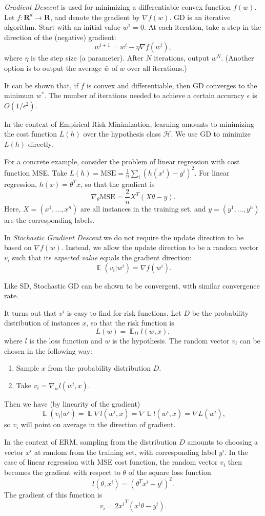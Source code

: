 \documentclass{article}
\newcommand{\R}{\mathbf{R}}
\newcommand{\grad}{\nabla}
\newcommand{\MSE}{\textrm{MSE}}
\DeclareMathOperator{\E}{\mathbb{E}}
\begin{document}
\emph{Gradient Descent} is used for minimizing a differentiable convex function
$f(w)$. Let $f:\R^d\to\R$, and denote the gradient by $\grad f(w)$.
GD is an iterative algorithm. Start with an initial value $w^1=0$. At each
iteration, take a step in the direction of the (negative) gradient:
\[ w^{i+1} = w^i-\eta\grad f(w^i), \]
where $\eta$ is the step size (a parameter). After $N$ iterations, output
$w^N$. (Another option is to output the average $\bar w$ of $w$ over all
iterations.)

It can be shown that, if $f$ is convex and differentiable, then GD converges to
the minimum $w^*$. The number of iterations needed to achieve a certain
accuracy $\epsilon$ is $O(1/\epsilon^2)$.

In the context of Empirical Risk Minimization, learning amounts to minimizing
the cost function $L(h)$ over the hypothesis class $\mathcal{H}$. We use GD to
minimize $L(h)$ directly.

For a concrete example, consider the problem of linear regression with cost
function MSE. Take $L(h) = \MSE = \frac{1}{n}\sum_i (h(x^i)-y^i)^2$. For linear
regression, $h(x)=\theta^T x$, so that the gradient is 
\[ \grad_\theta \MSE = \frac{2}{n} X^T(X\theta-y). \]
Here, $X=(x^1,\dotsc,x^n)$ are all instances in the training set, and
$y=(y^1,\dotsc,y^n)$ are the corresponding labels.

In \emph{Stochastic Gradient Descent} we do not require the update direction to
be based on $\grad f(w)$. Instead, we allow the update direction to be a random
vector $v_i$ such that its \emph{expected value} equals the gradient direction:
\[ \E{(v_i|w^i)}=\grad f(w^i).\]

Like SD, Stochastic GD can be shown to be convergent, with similar convergence
rate.

It turns out that $v^i$ is easy to find for risk functions. Let $D$ be the
probability distribution of instances $x$, so that the risk function is
\[ L(w)=\E_D{l(w,x)}, \]
where $l$ is the loss function and $w$ is the hypothesis. 
The random vector $v_i$ can be chosen in the following way:
\begin{enumerate}
    \item Sample $x$ from the probability distribution $D$.
    \item Take $v_i=\grad_w l(w^i, x)$.
\end{enumerate}
Then we have (by linearity of the gradient)
\[ \E{(v_i|w^i)} = \E{\grad l(w^i, x)} = \grad\E{l(w^i,x)} = \grad L(w^i), \]
so $v_i$ will point on average in the direction of gradient.


In the context of ERM, sampling from the distribution $D$ amounts to choosing a
vector $x^i$ at random from the training set, with corresponding label $y^i$.
In the case of linear regression with MSE cost function, the random vector
$v_i$ then becomes the gradient with respect to $\theta$ of the square loss
function
\[ l(\theta,x^i) = (\theta^T x^i - y^i)^2. \]
The gradient of this function is
\[ v_i = 2 {x^i}^T (x^i\theta-y^i). \]
\end{document}
